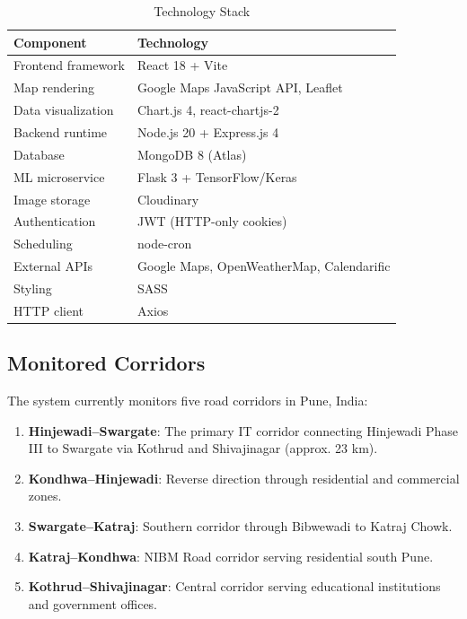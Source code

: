 \documentclass[conference]{IEEEtran}
\begin{document}
\begin{table}[htbp]
\caption{Technology Stack}
\begin{center}
\begin{tabular}{ll}
\toprule
\textbf{Component} & \textbf{Technology} \\
\midrule
Frontend framework & React 18 + Vite \\
Map rendering & Google Maps JavaScript API, Leaflet \\
Data visualization & Chart.js 4, react-chartjs-2 \\
Backend runtime & Node.js 20 + Express.js 4 \\
Database & MongoDB 8 (Atlas) \\
ML microservice & Flask 3 + TensorFlow/Keras \\
Image storage & Cloudinary \\
Authentication & JWT (HTTP-only cookies) \\
Scheduling & node-cron \\
External APIs & Google Maps, OpenWeatherMap, Calendarific \\
Styling & SASS \\
HTTP client & Axios \\
\bottomrule
\end{tabular}
\label{tab:stack}
\end{center}
\end{table}

\subsection{Monitored Corridors}

The system currently monitors five road corridors in Pune, India:
\begin{enumerate}
    \item \textbf{Hinjewadi–Swargate}: The primary IT corridor connecting Hinjewadi Phase III to Swargate via Kothrud and Shivajinagar (approx. 23 km).
    \item \textbf{Kondhwa–Hinjewadi}: Reverse direction through residential and commercial zones.
    \item \textbf{Swargate–Katraj}: Southern corridor through Bibwewadi to Katraj Chowk.
    \item \textbf{Katraj–Kondhwa}: NIBM Road corridor serving residential south Pune.
    \item \textbf{Kothrud–Shivajinagar}: Central corridor serving educational institutions and government offices.
\end{enumerate}
\end{document}
